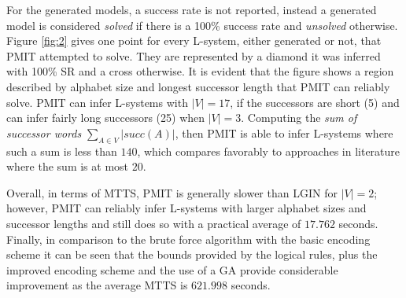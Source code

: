 \documentclass{llncs}
\begin{document}
	For the generated models, a success rate is not reported, instead a generated model is considered \textit{solved} if there is a 100\% success rate and \textit{unsolved} otherwise. Figure \ref{fig:2} gives one point for every L-system, either generated or not, that PMIT attempted to solve. They are represented by a diamond it was inferred with 100\% SR and a cross otherwise. It is evident that the figure shows a region described by alphabet size and longest successor length that PMIT can reliably solve. PMIT can infer L-systems with $|V|=17$, if the successors are short (5) and can infer fairly long successors (25) when $|V|=3$. Computing the \textit{sum of successor words} $\sum_{A \in V} |succ(A)|$, then PMIT is able to infer L-systems where such a sum is less than $140$, which compares favorably to approaches in literature where the sum is at most $20$.
	
	Overall, in terms of MTTS, PMIT is generally slower than LGIN \cite{nakano_inferD0Lerrorfree} for $|V|=2$; however, PMIT can reliably infer L-systems with larger alphabet sizes and successor lengths and still does so with a practical average of $17.762$ seconds. Finally, in comparison to the brute force algorithm with the basic encoding scheme it can be seen that the bounds provided by the logical rules, plus the improved encoding scheme and the use of a GA provide considerable improvement as the average MTTS is $621.998$ seconds.
	
\end{document}
